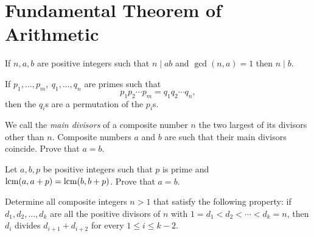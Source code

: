 \section{Fundamental Theorem of Arithmetic}\label{n:n:ftoa}
\begin{result}{\label{r:n:n:f:1}}
    If $n,a,b$ are positive integers such that $n\mid ab$ and
      $\gcd(n,a)=1$ then $n\mid b$.
\end{result}
\begin{result}{\label{r:n:n:f:2}}
    If $p_1,\ldots,p_m,\ q_1,\ldots,q_n$ are primes such that
      \[p_1p_2\cdots p_m=q_1q_2\cdots q_n,\]
      then the $q_i$s are a permutation of the $p_i$s.
\end{result}
\begin{problem}{\label{p:n:n:f:1}}
    We call the \emph{main divisors} of a composite number $n$ the two
    largest of its divisors other than $n$. Composite numbers $a$ and $b$ are
    such that their main divisors coincide. Prove that $a=b$.
\end{problem}
\begin{problem}{\label{p:n:n:f:2}}
    Let $a,b,p$ be positive integers such that $p$ is prime and
    $\mathrm{lcm}(a,a+p)=\mathrm{lcm}(b,b+p)$. Prove that $a=b$.
\end{problem}
\begin{problem}{\label{p:n:n:f:3}}
    Determine all composite integers $n>1$ that satisfy the following
    property: if $d_1, d_2, \ldots, d_k$ are all the positive divisors of $n$
    with $1=d_1<d_2<\cdots<d_k=n$, then $d_i$ divides $d_{i+1}+d_{i+2}$ for
    every $1 \leq i \leq k-2$.
\end{problem}
